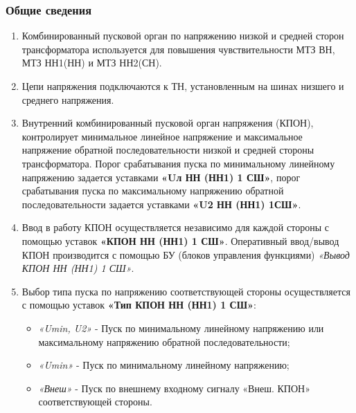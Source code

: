 \color{black}

\subsubsection{Общие сведения}

\begin{enumerate}[label=\arabic{section}.\arabic{subsection}.\arabic{subsubsection}.\arabic*,  align=left, labelsep=4pt, leftmargin=0pt, itemindent=57pt]

\item
Комбинированный пусковой орган по напряжению низкой и средней сторон трансформатора
используется для повышения чувствительности МТЗ ВН, МТЗ НН1(НН) и МТЗ НН2(СН).   

\item
Цепи напряжения подключаются к ТН, установленным на шинах низшего и среднего напряжения.

\item
Внутренний комбинированный пусковой орган напряжения (КПОН), контролирует минимальное
линейное напряжение и максимальное напряжение обратной последовательности низкой и средней
стороны трансформатора. Порог срабатывания пуска по минимальному линейному напряжению
задается уставками \textbf{«Uл НН (НН1) 1 СШ»}, порог срабатывания пуска по максимальному напряжению
обратной последовательности задается уставками \textbf{«U2 НН (НН1) 1СШ»}. 

\item
Ввод в работу КПОН осуществляется независимо для каждой стороны с помощью уставок \textbf{«КПОН
НН (НН1) 1 СШ»}. Оперативный ввод/вывод КПОН производится с помощью БУ (блоков управления
функциями) \textit{«Вывод КПОН НН (НН1) 1 СШ»}.

\item
Выбор типа пуска по напряжению соответствующей стороны осуществляется с помощью уставок \textbf{«Тип КПОН НН (НН1) 1 СШ»}: 
\begin{itemize}
\item \textit{«Umin, U2»} - Пуск по минимальному линейному напряжению или максимальному напряжению обратной последовательности;
\item \textit{«Umin»} - Пуск по минимальному линейному напряжению;
\item \textit{«Внеш»} - Пуск по внешнему входному сигналу «Внеш. КПОН» соответствующей стороны.
\end{itemize}


\end{enumerate}
